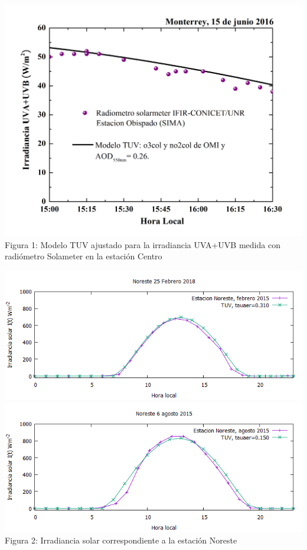 \documentclass{article}
\begin{document}
\begin{multicols}{2}
\vspace*{-0.7cm}
\begin{center}
\includegraphics[width=0.65\linewidth]{images/sima2.jpg}\\
\changefontsizes{12pt}
Figura 1: Modelo TUV ajustado para la irradiancia UVA+UVB medida con radiómetro Solameter en la estación Centro
\end{center}
\begin{center}
\includegraphics[scale=0.44]{images/nef.png}\\
\includegraphics[scale=0.44]{images/neg.png}\\
\changefontsizes{12pt}
Figura 2: Irradiancia solar correspondiente a la estación Noreste\\

\end{center}
\end{multicols}
\end{document}
